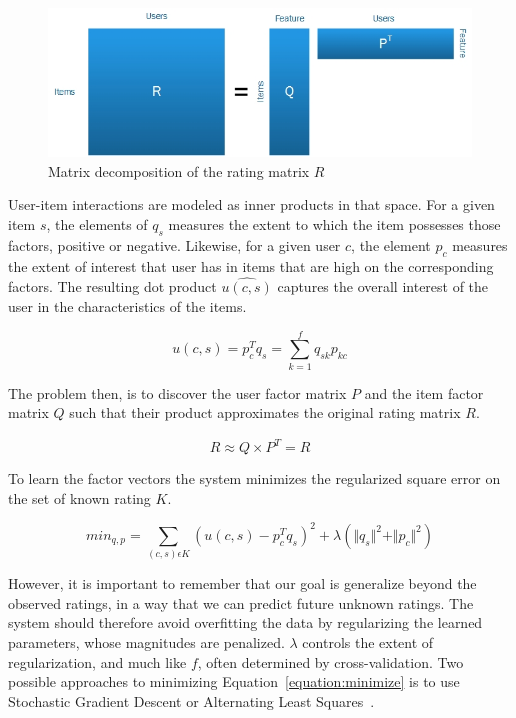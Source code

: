 \begin{figure}[H]
    \includegraphics[width=5in]{image/matrixdecomp.jpg}
    \centering
    \caption[Matrix decomposition of the rating matrix $R$]{Matrix decomposition of the rating matrix $R$}
    \label{figure:matrixdecomp}
\end{figure}

User-item interactions are modeled as inner products in that space. For a given
item $s$, the elements of $q_{s}$ measures the extent to which the item
possesses those factors, positive or negative. Likewise, for a given user $c$,
the element $p_{c}$ measures the extent of interest that user has in items that
are high on the corresponding factors. The resulting dot product $\hat{u(c,s)}$
captures the overall interest of the user in the characteristics of the items.

\begin{equation}
u(c,s) = p_{c}^{T}q_{s} = \sum_{k=1}^{f} q_{sk}p_{kc}
\end{equation}

The problem then, is to discover the user factor matrix $P$ and the item factor
matrix $Q$ such that their product approximates the original rating matrix $R$.

\begin{equation}
R \approx Q \times P^{T} = \hat{R}
\label{equation:dotproduct}
\end{equation}

To learn the factor vectors the system minimizes the regularized square error
on the set of known rating $K$.

\begin{equation}
\label{equation:minimize}
min_{q, p} = \sum_{(c,s)\epsilon K} (u(c,s) - p^{T}_{c}q_{s})^{2} + \lambda ( \Vert q_{s} \Vert ^{2} + \Vert p_{c} \Vert ^{2})
\end{equation}

However, it is important to remember that our goal is generalize beyond the
observed ratings, in a way that we can predict future unknown ratings. The
system should therefore avoid overfitting the data by regularizing the learned
parameters, whose magnitudes are penalized. $\lambda$ controls the extent of
regularization, and much like $f$, often determined by cross-validation. Two
possible approaches to minimizing Equation~\ref{equation:minimize} is to use
Stochastic Gradient Descent or Alternating Least Squares~\citep{Koren2009}.\newline

